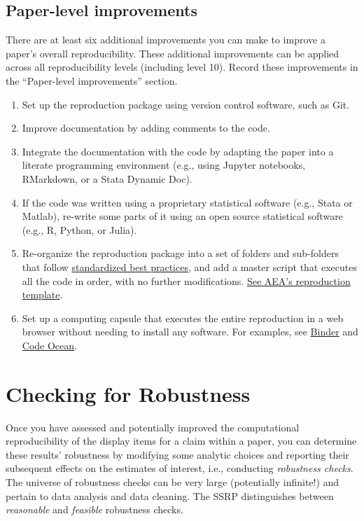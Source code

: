 \documentclass[
]{book}
\providecommand{\tightlist}{%
  \setlength{\itemsep}{0pt}\setlength{\parskip}{0pt}}
\begin{document}
\hypertarget{paper-level}{%
\section{Paper-level improvements}\label{paper-level}}

There are at least six additional improvements you can make to improve a paper's overall reproducibility. These additional improvements can be applied across all reproducibility levels (including level 10). Record these improvements in the ``Paper-level improvements'' section.

\begin{enumerate}
\def\labelenumi{\arabic{enumi}.}
\tightlist
\item
  Set up the reproduction package using version control software, such as Git.
\item
  Improve documentation by adding comments to the code.
\item
  Integrate the documentation with the code by adapting the paper into a literate programming environment (e.g., using Jupyter notebooks, RMarkdown, or a Stata Dynamic Doc).
\item
  If the code was written using a proprietary statistical software (e.g., Stata or Matlab), re-write some parts of it using an open source statistical software (e.g., R, Python, or Julia).
\item
  Re-organize the reproduction package into a set of folders and sub-folders that follow \href{https://www.projecttier.org/tier-protocol/specifications/\#overview-of-the-documentation}{standardized best practices}, and add a master script that executes all the code in order, with no further modifications. \href{https://github.com/AEADataEditor/replication-template}{See AEA's reproduction template}.\\
\item
  Set up a computing capsule that executes the entire reproduction in a web browser without needing to install any software. For examples, see \href{https://mybinder.org/}{Binder} and \href{https://codeocean.com/}{Code Ocean}.
\end{enumerate}

\hypertarget{robust}{%
\chapter{Checking for Robustness}\label{robust}}

Once you have assessed and potentially improved the computational reproducibility of the display items for a claim within a paper, you can determine these results' robustness by modifying some analytic choices and reporting their subsequent effects on the estimates of interest, i.e., conducting \emph{robustness checks}. The universe of robustness checks can be very large (potentially infinite!) and pertain to data analysis and data cleaning. The SSRP distinguishes between \emph{reasonable} and \emph{feasible} robustness checks.
\end{document}
